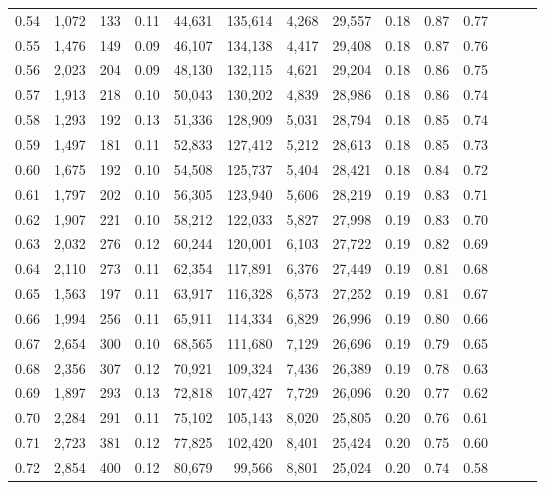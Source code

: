 \begin{tabular}{rrrrrrrrrrrrrr}
0.54 &  1,072 &    133 &  0.11 &   44,631 &  135,614 &   4,268 &  29,557 &  0.18 &  0.87 &      0.77 \\
0.55 &  1,476 &    149 &  0.09 &   46,107 &  134,138 &   4,417 &  29,408 &  0.18 &  0.87 &      0.76 \\
0.56 &  2,023 &    204 &  0.09 &   48,130 &  132,115 &   4,621 &  29,204 &  0.18 &  0.86 &      0.75 \\
0.57 &  1,913 &    218 &  0.10 &   50,043 &  130,202 &   4,839 &  28,986 &  0.18 &  0.86 &      0.74 \\
0.58 &  1,293 &    192 &  0.13 &   51,336 &  128,909 &   5,031 &  28,794 &  0.18 &  0.85 &      0.74 \\
0.59 &  1,497 &    181 &  0.11 &   52,833 &  127,412 &   5,212 &  28,613 &  0.18 &  0.85 &      0.73 \\
0.60 &  1,675 &    192 &  0.10 &   54,508 &  125,737 &   5,404 &  28,421 &  0.18 &  0.84 &      0.72 \\
0.61 &  1,797 &    202 &  0.10 &   56,305 &  123,940 &   5,606 &  28,219 &  0.19 &  0.83 &      0.71 \\
0.62 &  1,907 &    221 &  0.10 &   58,212 &  122,033 &   5,827 &  27,998 &  0.19 &  0.83 &      0.70 \\
0.63 &  2,032 &    276 &  0.12 &   60,244 &  120,001 &   6,103 &  27,722 &  0.19 &  0.82 &      0.69 \\
0.64 &  2,110 &    273 &  0.11 &   62,354 &  117,891 &   6,376 &  27,449 &  0.19 &  0.81 &      0.68 \\
0.65 &  1,563 &    197 &  0.11 &   63,917 &  116,328 &   6,573 &  27,252 &  0.19 &  0.81 &      0.67 \\
0.66 &  1,994 &    256 &  0.11 &   65,911 &  114,334 &   6,829 &  26,996 &  0.19 &  0.80 &      0.66 \\
0.67 &  2,654 &    300 &  0.10 &   68,565 &  111,680 &   7,129 &  26,696 &  0.19 &  0.79 &      0.65 \\
0.68 &  2,356 &    307 &  0.12 &   70,921 &  109,324 &   7,436 &  26,389 &  0.19 &  0.78 &      0.63 \\
0.69 &  1,897 &    293 &  0.13 &   72,818 &  107,427 &   7,729 &  26,096 &  0.20 &  0.77 &      0.62 \\
0.70 &  2,284 &    291 &  0.11 &   75,102 &  105,143 &   8,020 &  25,805 &  0.20 &  0.76 &      0.61 \\
0.71 &  2,723 &    381 &  0.12 &   77,825 &  102,420 &   8,401 &  25,424 &  0.20 &  0.75 &      0.60 \\
0.72 &  2,854 &    400 &  0.12 &   80,679 &   99,566 &   8,801 &  25,024 &  0.20 &  0.74 &      0.58 \\

\end{tabular}
